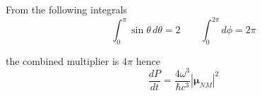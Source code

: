 \documentclass[12pt]{article}
\begin{document}
From the following integrals
\begin{equation*}
\int_0^\pi\sin\theta\,d\theta=2
\qquad
\int_0^{2\pi}d\phi=2\pi
\end{equation*}

the combined multiplier is $4\pi$ hence
\begin{equation*}
\frac{dP}{dt}
=\frac{4\omega^3}{\hbar c^3}
\left|\boldsymbol\mu_{NM}\right|^2
\end{equation*}

\end{document}
